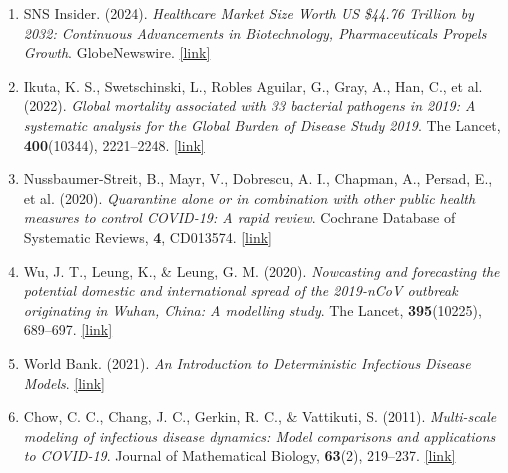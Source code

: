 \documentclass[a4paper]{article}
\begin{document}
	\begin{enumerate}
		
		\item SNS Insider. (2024). \textit{Healthcare Market Size Worth US \$44.76 Trillion by 2032: Continuous Advancements in Biotechnology, Pharmaceuticals Propels Growth}. GlobeNewswire. \href{https://www.globenewswire.com/news-release/2024/08/01/2923001/0/en/Healthcare-Market-Size-Worth-US-44-760-73-Billion-By-2032-Continuous-Advancements-in-Biotechnology-Pharmaceuticals-Propels-Growth-Research-by-SNS-Insider.html}{[link]}
		
		\item Ikuta, K. S., Swetschinski, L., Robles Aguilar, G., Gray, A., Han, C., et al. (2022). \textit{Global mortality associated with 33 bacterial pathogens in 2019: A systematic analysis for the Global Burden of Disease Study 2019}. The Lancet, \textbf{400}(10344), 2221–2248. \href{https://www.thelancet.com/journals/lancet/article/PIIS0140-6736(22)02185-7/fulltext}{[link]}
		
		\item Nussbaumer-Streit, B., Mayr, V., Dobrescu, A. I., Chapman, A., Persad, E., et al. (2020). \textit{Quarantine alone or in combination with other public health measures to control COVID-19: A rapid review}. Cochrane Database of Systematic Reviews, \textbf{4}, CD013574. \href{https://www.ncbi.nlm.nih.gov/pmc/articles/PMC7141753/}{[link]}
		
		\item Wu, J. T., Leung, K., \& Leung, G. M. (2020). \textit{Nowcasting and forecasting the potential domestic and international spread of the 2019-nCoV outbreak originating in Wuhan, China: A modelling study}. The Lancet, \textbf{395}(10225), 689–697. \href{https://www.nature.com/articles/s41591-020-0822-7}{[link]}
		
		\item World Bank. (2021). \textit{An Introduction to Deterministic Infectious Disease Models}. \href{https://documents1.worldbank.org/curated/en/888341625223820901/pdf/An-Introduction-to-Deterministic-Infectious-Disease-Models.pdf}{[link]}
		
		\item Chow, C. C., Chang, J. C., Gerkin, R. C., \& Vattikuti, S. (2011). \textit{Multi-scale modeling of infectious disease dynamics: Model comparisons and applications to COVID-19}. Journal of Mathematical Biology, \textbf{63}(2), 219–237. \href{https://www.sciencedirect.com/science/article/abs/pii/S0022519311004760}{[link]}
		

\end{enumerate}
\end{document}
